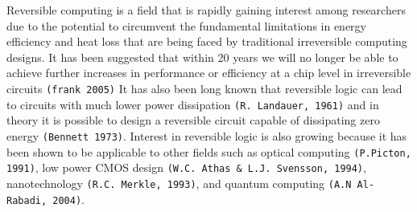 Reversible computing is a field that is rapidly gaining interest among researchers due 
to the potential to circumvent the fundamental limitations in energy efficiency and heat 
loss that are being faced by traditional irreversible computing designs. It has been 
suggested that within 20 years we will no longer be able to achieve further increases in 
performance or efficiency at a chip level in irreversible circuits \verb!(frank 2005)! It has 
also been long known that reversible logic can lead to circuits with much lower power 
dissipation \verb!(R. Landauer, 1961)! and in theory it is possible to design a reversible 
circuit capable of dissipating zero energy \verb!(Bennett 1973)!. Interest in reversible logic 
is also growing because it has been shown to be applicable to other fields such as 
optical computing \verb!(P.Picton, 1991)!, low power CMOS design \verb!(W.C. Athas & L.J. Svensson, 1994)!, 
nanotechnology \verb!(R.C. Merkle, 1993)!, and quantum computing \verb!(A.N Al-Rabadi, 2004)!.
